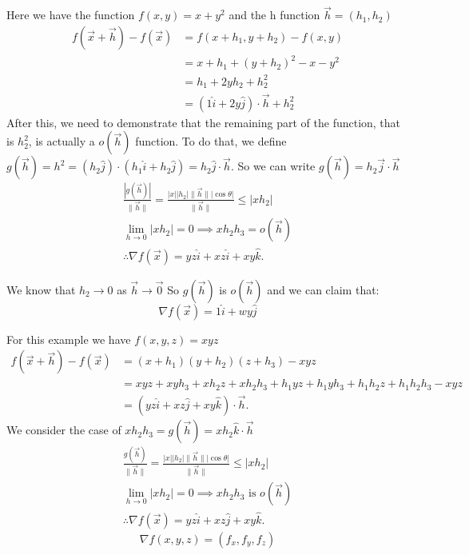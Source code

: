 \begin{itemize}
\begin{example}
	Here we have the function $f\left( x, y \right)  = x+y^2$ and the h function $\vec{h} = \left( h_1,h_2 \right) $
	\begin{align*}
		f(\vec{x} + \vec{h}) - f(\vec{x}) &= f(x+h_1, y+h_2) - f(x, y)\\
						  &= x + h_1 + (y +h_2)^2 - x - y^2\\
						  &= h_1 + 2yh_2 + h_2^2\\
						  &= (1\hat{i} + 2y\hat{j})\cdot \vec{h} + h_2^2
	\end{align*}
	After this, we need to demonstrate that the remaining part of the function, that is $h_2^2$, is actually a $o\left( \vec{h} \right) $ function. To do that, we define $g(\vec{h}) = h^2 = (h_2\hat{j})\cdot (h_1\hat{i}+h_2\hat{j}) = h_2\hat{j}\cdot \vec{h}$. So we can write $g\left( \vec{h} \right)  = h_2\vec{j}\cdot \vec{h}$ 
\begin{align*}
	\frac{|g\left( \vec{h} \right) |}{\lVert \vec{h} \rVert } = \frac{|x| |h_2| \lVert \vec{h} \rVert |\cos \theta|}{\lVert \vec{h} \rVert } \le |xh_2|\\
	\lim_{h \to 0} |xh_2| = 0 \implies xh_2h_3 = o\left( \vec{h} \right) \\
	\therefore \nabla f\left( \vec{x} \right) = yz\hat{i} + xz\hat{i} + xy\hat{k}
.\end{align*}
	
	 We know that $h_2\to 0$ as $\vec{h}\to \vec{0}$ So $g(\vec{h})$ is $o(\vec{h})$ and we can claim that:
	 \begin{equation}
	 	\nabla f(\vec{x}) = 1\hat{i} + wy\hat{j}
	 \end{equation}
\end{example}
\begin{example}
	For this example we have $f\left( x, y, z \right)  = xyz$
	\begin{align*}
		f\left( \vec{x} + \vec{h} \right)  - f\left( \vec{x} \right)  &= \left( x+h_1 \right) \left( y+h_2 \right) \left( z+h_3 \right)  - xyz\\
		&= xyz + xyh_3 + xh_2z + xh_2h_3+h_1yz + h_1yh_3 + h_1h_2z + h_1h_2h_3 - xyz\\
		&=\left( yz\hat{i} + xz\hat{j} + xy\hat{k} \right) \cdot \vec{h}
	.\end{align*}
	We consider the case of $xh_2h_3 = g(\vec{h}) = xh_2\hat{k}\cdot \vec{h}$
	\begin{align*}
		\frac{g\left( \vec{h} \right) }{\lVert \vec{h} \rVert } = \frac{|x| |h_2| \lVert \vec{h} \rVert |\cos \theta| }{\lVert \vec{h} \rVert } \le |xh_2|\\
		\lim_{h \to 0} |xh_2| = 0 \implies xh_2h_3 \text{ is }  o\left( \vec{h} \right)\\
		\therefore \nabla f\left( \vec{x} \right)  = yz\hat{i} + xz\hat{j} + xy\hat{k}
	.\end{align*}
	\begin{equation}
		\nabla f\left( x,y,z \right)  = \left( f_x, f_y, f_z \right) 
	\end{equation}


\end{example}
\end{itemize}
